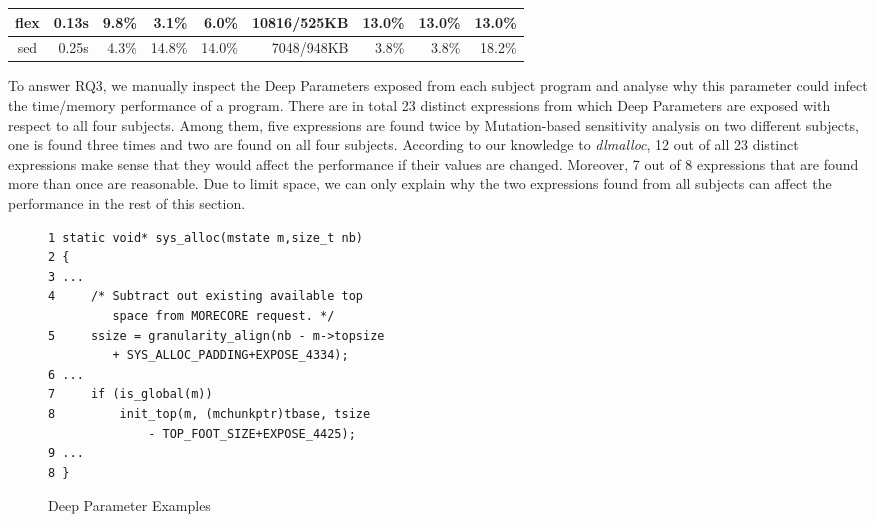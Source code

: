 \begin{table*}[htbp]
\begin{tabular}{|c|r|r|r|r|r|r|r|r|}
flex                                                                    & 0.13s                                                                    & 9.8\%      & 3.1\%      & 6.0\%     & 10816/525KB                                                                              & 13.0\%       & 13.0\%        & 13.0\%       \\ \hline
sed                                                                     & 0.25s                                                                    & 4.3\%      & 14.8\%     & 14.0\%    & 7048/948KB                                                                               & 3.8\%        & 3.8\%         & 18.2\%       \\ \hline
\end{tabular}
\end{table*}

To answer RQ3, we manually inspect the Deep Parameters exposed from each subject program and analyse why this parameter could infect the time/memory performance of a program. There are in total 23 distinct expressions from which Deep Parameters are exposed with respect to all four subjects. Among them, five expressions are found twice by Mutation-based sensitivity analysis on two different subjects, one is found three times and two are found on all four subjects. According to our knowledge to \emph{dlmalloc}, 12 out of all 23 distinct expressions make sense that they would affect the performance if their values are changed. Moreover, 7 out of 8 expressions that are found more than once are reasonable. Due to limit space, we can only explain why the two expressions found from all subjects can affect the performance in the rest of this section.

\begin{figure}[ht]
\begin{lstlisting}
1 static void* sys_alloc(mstate m,size_t nb) 
2 {
3 ...
4     /* Subtract out existing available top 
         space from MORECORE request. */
5     ssize = granularity_align(nb - m->topsize
         + SYS_ALLOC_PADDING+EXPOSE_4334);
6 ...
7     if (is_global(m))
8         init_top(m, (mchunkptr)tbase, tsize
              - TOP_FOOT_SIZE+EXPOSE_4425);
9 ...
8 }

\end{lstlisting}
\label{deep_parameter}
\caption{Deep Parameter Examples}
\end{figure}

